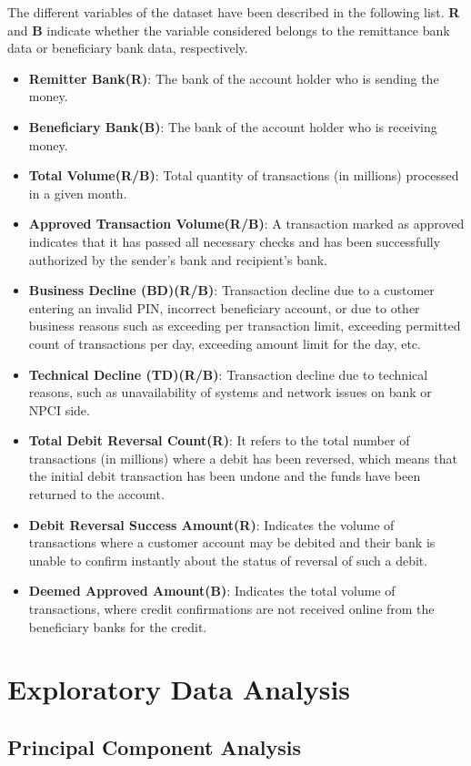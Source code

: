 \documentclass{article}
\begin{document}
The different variables of the dataset have been described in the following list. \textbf{R} and \textbf{B} indicate whether the variable considered belongs to the remittance bank data or beneficiary bank data, respectively.

\begin{itemize}
    \item \textbf{Remitter Bank(R)}: The bank of the account holder who is sending the money.
    \item \textbf{Beneficiary Bank(B)}: The bank of the account holder who is receiving money.
    \item \textbf{Total Volume(R/B)}: Total quantity of transactions (in millions) processed in a given month.
    \item \textbf{Approved Transaction Volume(R/B)}: A transaction marked as approved indicates that it has passed all necessary checks and has been successfully authorized by the sender’s bank and recipient’s bank.
    \item \textbf{Business Decline (BD)(R/B)}: Transaction decline due to a customer entering an invalid PIN, incorrect beneficiary account, or due to other business reasons such as exceeding per transaction limit, exceeding permitted count of transactions per day, exceeding amount limit for the day, etc.
    \item \textbf{Technical Decline (TD)(R/B)}: Transaction decline due to technical reasons, such as unavailability of systems and network issues on bank or NPCI side.
    \item \textbf{Total Debit Reversal Count(R)}: It refers to the total number of transactions (in millions) where a debit has been reversed, which means that the initial debit transaction has been undone and the funds have been returned to the account.
    \item \textbf{Debit Reversal Success Amount(R)}: Indicates the volume of transactions where a customer account may be debited and their bank is unable to confirm instantly about the status of reversal of such a debit.
    \item \textbf{Deemed Approved Amount(B)}: Indicates the total volume of transactions, where credit confirmations are not received online from the beneficiary banks for the credit.
\end{itemize}
\newpage
\section{Exploratory Data Analysis}
\subsection{Principal Component Analysis}
\end{document}
